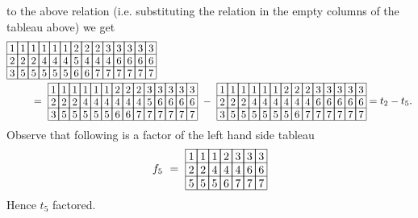 to the above relation (i.e. substituting the relation in the empty columns of the tableau above) we get 
\begin{align*}
&\begin{array}[c]{*{14}c}\cline{1-14}
\lr{1}&\lr{1}&\lr{1}&\lr{1}&\lr{1}&\lr{1}&\lr{2}&\lr{2}&\lr{2}&\lr{3}&\lr{3}&\lr{3}&\lr{3}&\lr{3}\\\cline{1-14}
\lr{2}&\lr{2}&\lr{2}&\lr{4}&\lr{4}&\lr{4}&\lr{5}&\lr{4}&\lr{4}&\lr{4}&\lr{6}&\lr{6}&\lr{6}&\lr{6}\\\cline{1-14}
\lr{3}&\lr{5}&\lr{5}&\lr{5}&\lr{5}&\lr{5}&\lr{6}&\lr{6}&\lr{7}&\lr{7}&\lr{7}&\lr{7}&\lr{7}&\lr{7}\\\cline{1-14}
\end{array}\\
&\hspace{20pt}\ =\ 
\begin{array}[c]{*{14}c}\cline{1-14}
\lr{1}&\lr{1}&\lr{1}&\lr{1}&\lr{1}&\lr{1}&\lr{2}&\lr{2}&\lr{2}&\lr{3}&\lr{3}&\lr{3}&\lr{3}&\lr{3}\\\cline{1-14}
\lr{2}&\lr{2}&\lr{2}&\lr{4}&\lr{4}&\lr{4}&\lr{4}&\lr{4}&\lr{4}&\lr{5}&\lr{6}&\lr{6}&\lr{6}&\lr{6}\\\cline{1-14}
\lr{3}&\lr{5}&\lr{5}&\lr{5}&\lr{5}&\lr{5}&\lr{6}&\lr{6}&\lr{7}&\lr{7}&\lr{7}&\lr{7}&\lr{7}&\lr{7}\\\cline{1-14}
\end{array}
\ -\ 
\begin{array}[c]{*{14}c}\cline{1-14}
\lr{1}&\lr{1}&\lr{1}&\lr{1}&\lr{1}&\lr{1}&\lr{2}&\lr{2}&\lr{2}&\lr{3}&\lr{3}&\lr{3}&\lr{3}&\lr{3}\\\cline{1-14}
\lr{2}&\lr{2}&\lr{2}&\lr{4}&\lr{4}&\lr{4}&\lr{4}&\lr{4}&\lr{4}&\lr{6}&\lr{6}&\lr{6}&\lr{6}&\lr{6}\\\cline{1-14}
\lr{3}&\lr{5}&\lr{5}&\lr{5}&\lr{5}&\lr{5}&\lr{5}&\lr{6}&\lr{7}&\lr{7}&\lr{7}&\lr{7}&\lr{7}&\lr{7}\\\cline{1-14}
\end{array}
= t_2 - t_5. 
\end{align*}
Observe that following is a factor of the left hand side tableau 
\[
f_5\ =\ 
\begin{array}[c]{*{7}c}\cline{1-7}
\lr{1}&\lr{1}&\lr{1}&\lr{2}&\lr{3}&\lr{3}&\lr{3}\\\cline{1-7}
\lr{2}&\lr{2}&\lr{4}&\lr{4}&\lr{4}&\lr{6}&\lr{6}\\\cline{1-7}
\lr{5}&\lr{5}&\lr{5}&\lr{6}&\lr{7}&\lr{7}&\lr{7}\\\cline{1-7}
\end{array}
\]
Hence \(t_5\) factored.

